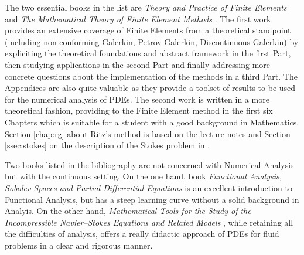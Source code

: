 The two essential books in the list are \textit{Theory and {P}ractice of {F}inite {E}lements} \cite{EG} and \textit{The {M}athematical {T}heory of {F}inite {E}lement {M}ethods} \cite{BS}.
The first work provides an extensive coverage of Finite Elements from a theoretical standpoint (including non-conforming Galerkin, Petrov-Galerkin, Discontinuous Galerkin) by expliciting the theoretical foundations and abstract framework in the first Part, then studying applications in the second Part and finally addressing more concrete questions about the implementation of the methods in a third Part. The Appendices are also quite valuable as they provide a toolset of results to be used for the numerical analysis of PDEs.
The second work is written in a more theoretical fashion, providing  to the Finite Element method in the first six Chapters which is suitable for a student with a good background in Mathematics.
Section \ref{chap:rg} about Ritz's method is based on the lecture notes \cite{RH} and Section \ref{ssec:stokes} on the description of the Stokes problem in \cite{JCL}.

Two books listed in the bibliography are not concerned with Numerical Analysis but with the continuous setting.
On the one hand, book \textit{Functional {A}nalysis, {S}obolev {S}paces and {P}artial {D}ifferential {E}quations} \cite{Brezis} is an excellent introduction to Functional Analysis, but has a steep learning curve without a solid background in Analyis.
On the other hand, \textit{Mathematical {T}ools for the {S}tudy of the {I}ncompressible {N}avier--Stokes {E}quations and {R}elated {M}odels} \cite{BF}, while retaining all the difficulties of analysis, offers a really didactic approach of PDEs for fluid problems in a clear and rigorous manner.
